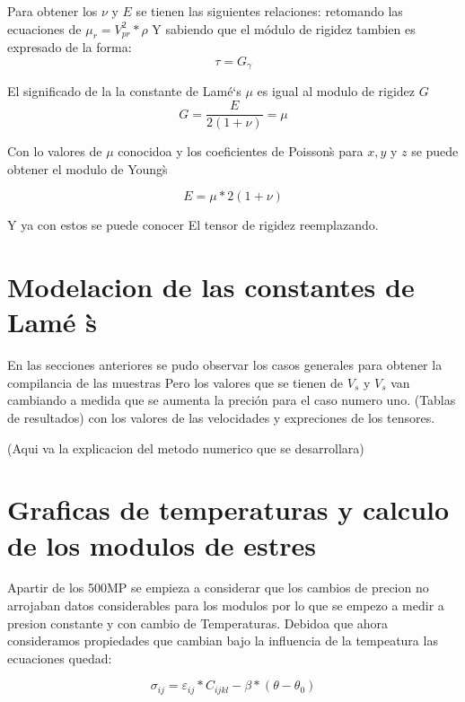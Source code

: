 \documentclass{article}
\begin{document}
Para  obtener los $\nu$ y $E$ se  tienen las siguientes relaciones:
retomando las ecuaciones de $\mu_{r}= V_{pr}^{2}*\rho$ Y sabiendo que el m\'odulo de rigidez  tambien es expresado de la forma:
\begin{equation}
 \tau=G_{\gamma}
\end{equation}

El significado de la la constante  de Lam\'e`s $\mu$ es igual al modulo de rigidez $G$ 
\begin{equation}
 G=\dfrac{E}{2(1+\nu)}=\mu
\end{equation}

Con lo  valores  de $\mu$ conocidoa y los  coeficientes de Poisson\`s  para $x, y $ y $z $  se  puede  obtener  el modulo de Young\`s 

\begin{equation}
E= \mu*2(1+\nu)
\end{equation}

Y ya  con estos se puede conocer El tensor de rigidez reemplazando. 

\section{Modelacion de las constantes de Lam\'e \`s}

En las  secciones  anteriores  se  pudo observar los casos generales para obtener la compilancia de las muestras Pero los valores que se tienen de $V_{s}$ y $V_{s}$ van cambiando a medida  que se  aumenta la preci\'on para el caso  numero uno. 
(Tablas de resultados) con los  valores de las velocidades y expreciones de los tensores.  

(Aqui  va la  explicacion del metodo  numerico que  se  desarrollara)

\section{Graficas de temperaturas y calculo de los modulos de estres }

Apartir de los 500MP se  empieza  a  considerar que los cambios de precion no arrojaban datos considerables para los modulos por lo que se empezo a medir a presion constante y  con cambio de Temperaturas. Debidoa que ahora consideramos propiedades que  cambian bajo la  influencia de la tempeatura las ecuaciones quedad:

\begin{equation}
 \sigma_{ij}=\varepsilon_{ij}*C_{ijkl} -\beta*(\theta-\theta_{0})
\end{equation}
\end{document}
